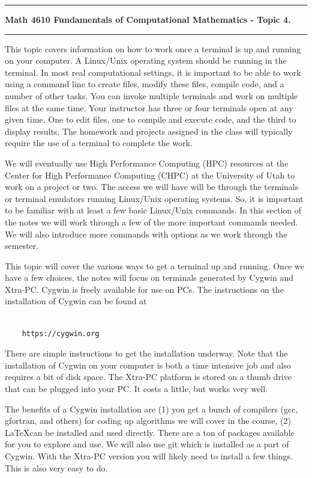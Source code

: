 \documentclass[10pt,fleqn]{article}
\begin{document}
\vskip0.1in\hrule\vskip0.1in
\noindent
{\bf Math 4610 Fundamentals of Computational Mathematics  - Topic 4.}
\vskip0.1in\hrule\vskip0.1in

This topic covers information on how to work once a terminal is up and running
on your computer. A Linux/Unix operating system should be running in the
terminal. In most real computational settings, it is important to be able to
work using a command line to create files, modify these files, compile
code, and a number of other tasks. You can invoke multiple terminals and work on
multiple files at the same time. Your instructor has three or four terminals
open at any given time. One to edit files, one to compile and execute code, and
the third to display results. The homework and projects assigned in the class
will typically require the use of a terminal to complete the work.

We will eventually use High Performance Computing (HPC) resources at the Center
for High Performance Computing (CHPC) at the University of Utah to work on a
project or two. The access we will have will be through the terminals or
terminal emulators running Linux/Unix operating systems. So, it is important to
be familiar with at least a few basic Linux/Unix commands. In this section of
the notes we will work through a few of the more important commands needed. We
will also introduce more commands with options as we work through the semester.





This topic will cover the various ways to get a
terminal up and running. Once we have a few choices, the notes will focus on
terminals generated by Cygwin and Xtra-PC. Cygwin is freely available for use
on PCs. The instructions on the installation of Cygwin can be found at
\begin{verbatim}

    https://cygwin.org

\end{verbatim}
There are simple instructions to get the installation underway. Note that the
installation of Cygwin on your computer is both a time intensive job and also
requires a bit of disk space. The Xtra-PC platform is stored on a thumb drive
that can be plugged into your PC. It costs a little, but works very well.

The benefits of a Cygwin installation are (1) you get a bunch of compilers (gcc,
gfortran, and others) for coding up algorithms we will cover in the course, (2)
\LaTeX can be installed and used directly. There are a ton of packages available
for you to explore and use. We will also use git which is installed as a part of
Cygwin. With the Xtra-PC version you will likely need to install a few things.
This is also very easy to do.
\end{document}
